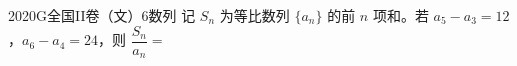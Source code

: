 
\begin{problem}{2020}{G}{全国II卷（文）}{6}{数列}
记 $ S_n $ 为等比数列 $ \{a_n\} $ 的前 $ n $ 项和。若 $ a_5-a_3=12 $，$ a_6-a_4=24 $，则 $ \dfrac{S_n}{a_n}= $
\begin{choices}
\end{choices}
\end{problem}

\begin{answer}

\end{answer}

\begin{solutions}

\end{solutions}